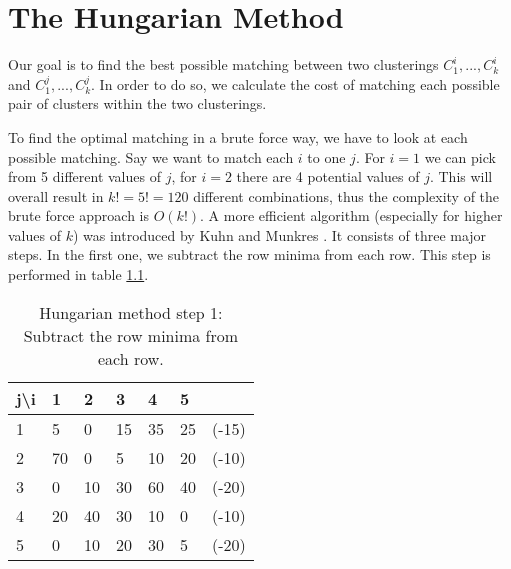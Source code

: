 \chapter{The Hungarian Method}
\label{sec:hungarian}

Our goal is to find the best possible matching between two clusterings $C_1^i, ..., C_k^i$ and $C_1^j, ..., C_k^j$. In order to do so, we calculate the cost of matching each possible pair of clusters within the two clusterings. 


To find the optimal matching in a brute force way, we have to look at each possible matching. Say we want to match each $i$ to one $j$. For $i = 1$ we can pick from 5 different values of $j$, for $i = 2$ there are 4 potential values of $j$. This will overall result in $k! = 5! = 120$ different combinations, thus the complexity of the brute force approach is $O(k!)$. A more efficient algorithm (especially for higher values of $k$) was introduced by Kuhn and Munkres \cite{kuhn1955hungarian}\cite{munkres1957algorithms}. It consists of three major steps. In the first one, we subtract the row minima from each row. This step is performed in table \ref{app:hung:step1}.

\begin{table}[h]
    \centering
    \begin{tabular}{|l | l l l l l| l |}
    \hline
    j\textbackslash i & 1 & 2 & 3 & 4 & 5 & \\ \hline
    1 & 5 & 0 & 15 & 35 & 25 & (-15)\\
    2 & 70 & 0 & 5 & 10 & 20 & (-10)\\
    3 & 0 & 10 & 30 & 60 & 40 & (-20)\\
    4 & 20 & 40 & 30 & 10 & 0 & (-10)\\
    5 & 0 & 10 & 20 & 30 & 5 & (-20)\\ \hline
    \end{tabular}
    \caption{Hungarian method step 1: Subtract the row minima from each row.}
    \label{app:hung:step1}
\end{table}

